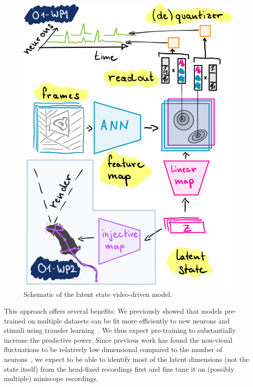 \documentclass[B2,COG]{ercgrant}
\begin{document}
\begin{figure}
\vspace{-3ex}
\includegraphics[width=\linewidth]{figures/model.pdf}
\caption{Schematic of the latent state video-driven model.\label{fig:model}}
\end{figure}
 This approach offers several benefits:
 We previously showed that models pre-trained on multiple datasets can be fit more efficiently to new neurons and stimuli using transfer learning~\parencite{Lurz2020-ua}. We thus expect pre-training to substantially increase the predictive power. 
 Since previous work has found the non-visual fluctuations to be relatively low dimensional compared to the number of neurons~\parencite{Stringer2019-lt}, we expect to be able to identify most of the latent dimensions (not the state itself) from the head-fixed recordings first and fine tune it on (possibly multiple) miniscope recordings. 
\end{document}
